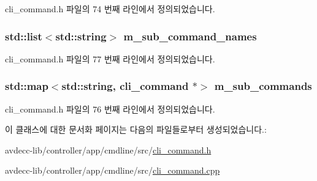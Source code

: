 cli\+\_\+command.\+h 파일의 74 번째 라인에서 정의되었습니다.

\subsubsection[{\texorpdfstring{m\+\_\+sub\+\_\+command\+\_\+names}{m_sub_command_names}}]{\setlength{\rightskip}{0pt plus 5cm}std\+::list$<$std\+::string$>$ m\+\_\+sub\+\_\+command\+\_\+names\hspace{0.3cm}{\ttfamily [private]}}\hypertarget{classcli__command_a824b70a5cacc9d075f4d79b183abe960}{}\label{classcli__command_a824b70a5cacc9d075f4d79b183abe960}


cli\+\_\+command.\+h 파일의 77 번째 라인에서 정의되었습니다.

\subsubsection[{\texorpdfstring{m\+\_\+sub\+\_\+commands}{m_sub_commands}}]{\setlength{\rightskip}{0pt plus 5cm}std\+::map$<$std\+::string, {\bf cli\+\_\+command} $\ast$$>$ m\+\_\+sub\+\_\+commands\hspace{0.3cm}{\ttfamily [private]}}\hypertarget{classcli__command_a5a62acea342a09bb5de738b81f3243b5}{}\label{classcli__command_a5a62acea342a09bb5de738b81f3243b5}


cli\+\_\+command.\+h 파일의 76 번째 라인에서 정의되었습니다.



이 클래스에 대한 문서화 페이지는 다음의 파일들로부터 생성되었습니다.\+:\begin{DoxyCompactItemize}
\item 
avdecc-\/lib/controller/app/cmdline/src/\hyperlink{cli__command_8h}{cli\+\_\+command.\+h}\item 
avdecc-\/lib/controller/app/cmdline/src/\hyperlink{cli__command_8cpp}{cli\+\_\+command.\+cpp}\end{DoxyCompactItemize}

